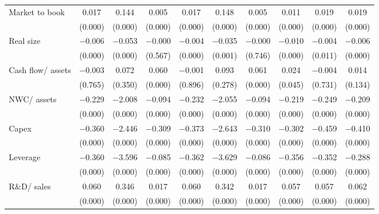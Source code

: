 {\begin{longtable}{l*{9}{c}}
\addlinespace
Market to book      &       0.017&       0.144&       0.005&       0.017&       0.148&       0.005&       0.011&       0.019&       0.019\\
                    &     (0.000)&     (0.000)&     (0.000)&     (0.000)&     (0.000)&     (0.000)&     (0.000)&     (0.000)&     (0.000)\\
\addlinespace
Real size           &    $-$0.006&    $-$0.053&    $-$0.000&    $-$0.004&    $-$0.035&    $-$0.000&    $-$0.010&    $-$0.004&    $-$0.006\\
                    &     (0.000)&     (0.000)&     (0.567)&     (0.000)&     (0.001)&     (0.746)&     (0.000)&     (0.011)&     (0.000)\\
\addlinespace
Cash flow/ assets   &    $-$0.003&       0.072&       0.060&    $-$0.001&       0.093&       0.061&       0.024&    $-$0.004&       0.014\\
                    &     (0.765)&     (0.350)&     (0.000)&     (0.896)&     (0.278)&     (0.000)&     (0.045)&     (0.731)&     (0.134)\\
\addlinespace
NWC/ assets         &    $-$0.229&    $-$2.008&    $-$0.094&    $-$0.232&    $-$2.055&    $-$0.094&    $-$0.219&    $-$0.249&    $-$0.209\\
                    &     (0.000)&     (0.000)&     (0.000)&     (0.000)&     (0.000)&     (0.000)&     (0.000)&     (0.000)&     (0.000)\\
\addlinespace
Capex               &    $-$0.360&    $-$2.446&    $-$0.309&    $-$0.373&    $-$2.643&    $-$0.310&    $-$0.302&    $-$0.459&    $-$0.410\\
                    &     (0.000)&     (0.000)&     (0.000)&     (0.000)&     (0.000)&     (0.000)&     (0.000)&     (0.000)&     (0.000)\\
\addlinespace
Leverage            &    $-$0.360&    $-$3.596&    $-$0.085&    $-$0.362&    $-$3.629&    $-$0.086&    $-$0.356&    $-$0.352&    $-$0.288\\
                    &     (0.000)&     (0.000)&     (0.000)&     (0.000)&     (0.000)&     (0.000)&     (0.000)&     (0.000)&     (0.000)\\
\addlinespace
R\&D/ sales         &       0.060&       0.346&       0.017&       0.060&       0.342&       0.017&       0.057&       0.057&       0.062\\
                    &     (0.000)&     (0.000)&     (0.000)&     (0.000)&     (0.000)&     (0.000)&     (0.000)&     (0.000)&     (0.000)\\

\end{longtable}}
